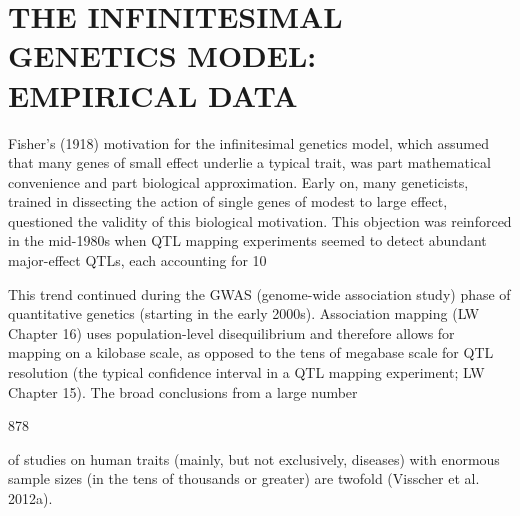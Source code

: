 \documentclass{article}
\begin{document}
\section{THE INFINITESIMAL GENETICS MODEL: EMPIRICAL DATA}
Fisher's (1918) motivation for the infinitesimal genetics model, which assumed that many genes of small effect underlie a typical trait, was part mathematical convenience and part biological approximation. Early on, many geneticists, trained in dissecting the action of single genes of modest to large effect, questioned the validity of this biological motivation. This objection was reinforced in the mid-1980s when QTL mapping experiments seemed to detect abundant major-effect QTLs, each accounting for 10%

This trend continued during the GWAS (genome-wide association study) phase of quantitative genetics (starting in the early 2000s). Association mapping (LW Chapter 16) uses population-level disequilibrium and therefore allows for mapping on a kilobase scale, as opposed to the tens of megabase scale for QTL resolution (the typical confidence interval in a QTL mapping experiment; LW Chapter 15). The broad conclusions from a large number

878

of studies on human traits (mainly, but not exclusively, diseases) with enormous sample sizes (in the tens of thousands or greater) are twofold (Visscher et al. 2012a).
\end{document}
